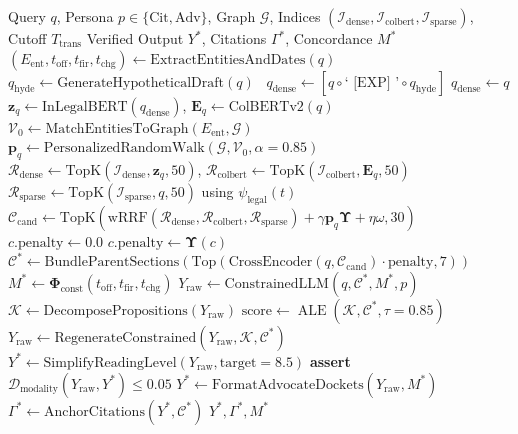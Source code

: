 \documentclass[conference]{IEEEtran}
\begin{document}
\begin{algorithm}[!t]
\caption{Nirnay-X Grounded Verification Pipeline (PAVE)}
\label{alg:master}
\begin{algorithmic}[1]
\Require Query $q$, Persona $p \in \{\text{Cit}, \text{Adv}\}$, Graph $\mathcal{G}$, Indices $(\mathcal{I}_{\text{dense}}, \mathcal{I}_{\text{colbert}}, \mathcal{I}_{\text{sparse}})$, Cutoff $T_{\text{trans}}$
\Ensure Verified Output $Y^*$, Citations $\Gamma^*$, Concordance $M^*$
\State $(E_{\text{ent}}, t_{\text{off}}, t_{\text{fir}}, t_{\text{chg}}) \gets \text{ExtractEntitiesAndDates}(q)$
    \State $q_{\text{hyde}} \gets \text{GenerateHypotheticalDraft}(q)$~\cite{gao2023precise}
    \State $q_{\text{dense}} \gets [q \circ \text{` [EXP] '} \circ q_{\text{hyde}}]$
\Else
    \State $q_{\text{dense}} \gets q$
\EndIf
\State $\mathbf{z}_q \gets \text{InLegalBERT}(q_{\text{dense}})$, $\mathbf{E}_q \gets \text{ColBERTv2}(q)$
\State $\mathcal{V}_0 \gets \text{MatchEntitiesToGraph}(E_{\text{ent}}, \mathcal{G})$
\State $\mathbf{p}_q \gets \text{PersonalizedRandomWalk}(\mathcal{G}, \mathcal{V}_0, \alpha=0.85)$
\State $\mathcal{R}_{\text{dense}} \gets \text{TopK}(\mathcal{I}_{\text{dense}}, \mathbf{z}_q, 50)$, $\mathcal{R}_{\text{colbert}} \gets \text{TopK}(\mathcal{I}_{\text{colbert}}, \mathbf{E}_q, 50)$
\State $\mathcal{R}_{\text{sparse}} \gets \text{TopK}(\mathcal{I}_{\text{sparse}}, q, 50)$ using $\psi_{\text{legal}}(t)$
\State $\mathcal{C}_{\text{cand}} \gets \text{TopK}(\text{wRRF}(\mathcal{R}_{\text{dense}}, \mathcal{R}_{\text{colbert}}, \mathcal{R}_{\text{sparse}}) + \gamma \mathbf{p}_q \mathbf{\Upsilon} + \eta \omega, 30)$
        \State $c.\text{penalty} \gets 0.0$
    \Else
        \State $c.\text{penalty} \gets \mathbf{\Upsilon}(c)$
    \EndIf
\EndFor
\State $\mathcal{C}^* \gets \text{BundleParentSections}(\text{Top}(\text{CrossEncoder}(q, \mathcal{C}_{\text{cand}}) \cdot \text{penalty}, 7))$
\State $M^* \gets \mathbf{\Phi}_{\text{const}}(t_{\text{off}}, t_{\text{fir}}, t_{\text{chg}})$
\State $Y_{\text{raw}} \gets \text{ConstrainedLLM}(q, \mathcal{C}^*, M^*, p)$
\State $\mathcal{K} \gets \text{DecomposePropositions}(Y_{\text{raw}})$
\State $\text{score} \gets \operatorname{ALE}(\mathcal{K}, \mathcal{C}^*, \tau=0.85)$
    \State $Y_{\text{raw}} \gets \text{RegenerateConstrained}(Y_{\text{raw}}, \mathcal{K}, \mathcal{C}^*)$
\EndIf
{}
    \State $Y^* \gets \text{SimplifyReadingLevel}(Y_{\text{raw}}, \text{target}=8.5)$
    \State \textbf{assert} $\mathcal{D}_{\text{modality}}(Y_{\text{raw}}, Y^*) \le 0.05$
\Else
    \State $Y^* \gets \text{FormatAdvocateDockets}(Y_{\text{raw}}, M^*)$
\EndIf
\State $\Gamma^* \gets \text{AnchorCitations}(Y^*, \mathcal{C}^*)$
\State \Return $Y^*, \Gamma^*, M^*$
\end{algorithmic}
\end{algorithm}
\end{document}
